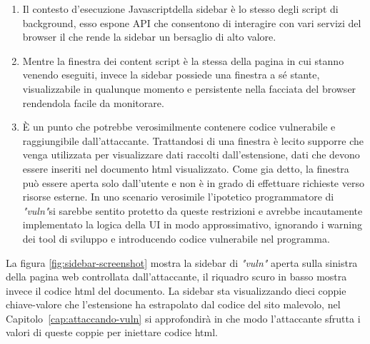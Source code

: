\documentclass{sapthesis}
\newcommand{\Capitolo}[1]{Capitolo~\ref{#1}}
\newcommand{\vuln}{\textit{"vuln"}}
\newcommand{\JS}{Javascript}
\begin{document}
        \begin{enumerate}
            \item Il contesto d'esecuzione \JS della sidebar è lo stesso degli script di background, esso espone
                    API che consentono di interagire con vari servizi del browser il che rende la sidebar un
                    bersaglio di alto valore.

            \item Mentre la finestra dei content script è la stessa della pagina in cui stanno venendo eseguiti,
                    invece la sidebar possiede una finestra a sé stante, visualizzabile in qualunque momento e 
                    persistente nella facciata del browser rendendola facile da monitorare.

            \item È un punto che potrebbe verosimilmente contenere codice vulnerabile e raggiungibile dall'attaccante.
                    Trattandosi di una finestra è lecito supporre che venga utilizzata per visualizzare dati raccolti 
                    dall'estensione, dati che devono essere inseriti nel documento html visualizzato.
                    Come gia detto, la finestra può essere aperta solo dall'utente e non
                    è in grado di effettuare richieste verso risorse esterne. In uno scenario verosimile l'ipotetico programmatore
                    di \vuln si sarebbe sentito protetto da queste restrizioni e avrebbe incautamente implementato
                    la logica della UI in modo approssimativo, ignorando i warning dei tool di
                    sviluppo e introducendo codice vulnerabile nel programma.
        \end{enumerate}

        La figura \ref{fig:sidebar-screenshot} mostra la sidebar di \vuln{} aperta sulla sinistra della pagina
        web controllata dall'attaccante, il riquadro scuro in basso mostra invece il codice html del documento.
        La sidebar sta visualizzando dieci coppie chiave-valore che l'estensione ha estrapolato dal codice
        del sito malevolo, nel \Capitolo{cap:attaccando-vuln} si approfondirà in che modo l'attaccante sfrutta i
        valori di queste coppie per iniettare codice html.
\end{document}
